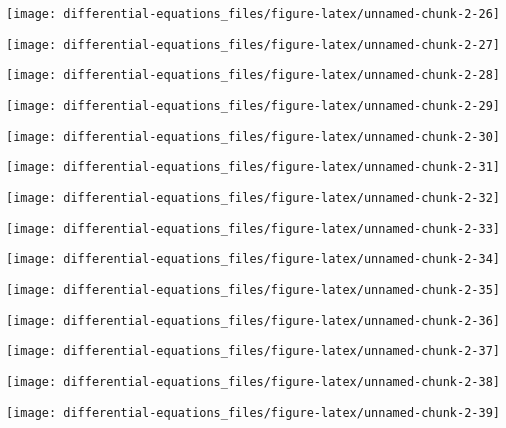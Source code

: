 \documentclass[]{tufte-handout}
\begin{document}
\begin{marginfigure}
\texttt{[image: differential-equations\_files/figure-latex/unnamed-chunk-2-26]} \end{marginfigure}
\begin{marginfigure}
\texttt{[image: differential-equations\_files/figure-latex/unnamed-chunk-2-27]} \end{marginfigure}
\begin{marginfigure}
\texttt{[image: differential-equations\_files/figure-latex/unnamed-chunk-2-28]} \end{marginfigure}
\begin{marginfigure}
\texttt{[image: differential-equations\_files/figure-latex/unnamed-chunk-2-29]} \end{marginfigure}
\begin{marginfigure}
\texttt{[image: differential-equations\_files/figure-latex/unnamed-chunk-2-30]} \end{marginfigure}
\begin{marginfigure}
\texttt{[image: differential-equations\_files/figure-latex/unnamed-chunk-2-31]} \end{marginfigure}
\begin{marginfigure}
\texttt{[image: differential-equations\_files/figure-latex/unnamed-chunk-2-32]} \end{marginfigure}
\begin{marginfigure}
\texttt{[image: differential-equations\_files/figure-latex/unnamed-chunk-2-33]} \end{marginfigure}
\begin{marginfigure}
\texttt{[image: differential-equations\_files/figure-latex/unnamed-chunk-2-34]} \end{marginfigure}
\begin{marginfigure}
\texttt{[image: differential-equations\_files/figure-latex/unnamed-chunk-2-35]} \end{marginfigure}
\begin{marginfigure}
\texttt{[image: differential-equations\_files/figure-latex/unnamed-chunk-2-36]} \end{marginfigure}
\begin{marginfigure}
\texttt{[image: differential-equations\_files/figure-latex/unnamed-chunk-2-37]} \end{marginfigure}
\begin{marginfigure}
\texttt{[image: differential-equations\_files/figure-latex/unnamed-chunk-2-38]} \end{marginfigure}
\begin{marginfigure}
\texttt{[image: differential-equations\_files/figure-latex/unnamed-chunk-2-39]} \end{marginfigure}
\end{document}
